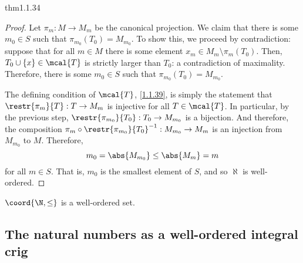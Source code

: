\begin{thm}{}{thm1.1.34}
\begin{proof}
Let $\pi _m:M\rightarrow M_m$ be the canonical projection.  We claim that there is some $m_0\in S$ such that $\pi _{m_0}(T_0)=M_{m_0}$.  To show this, we proceed by contradiction:  suppose that for all $m\in M$ there is some element $x_m\in M_m\setminus \pi _m(T_0)$.  Then, $T_0\cup \{ x\}\in \mcal{T}$ is strictly larger than $T_0$:  a contradiction of maximality.  Therefore, there is some $m_0\in S$ such that $\pi _{m_0}(T_0)=M_{m_0}$.

The defining condition of $\mcal{T}$, \eqref{1.1.39}, is simply the statement that $\restr{\pi _m}{T}:T\rightarrow M_m$ is injective for all $T\in \mcal{T}$.  In particular, by the previous step, $\restr{\pi _{m_0}}{T_0}:T_0\rightarrow M_{m_0}$ is a bijection.  And therefore, the composition $\pi _m\circ \restr{\pi _{m_0}}{T_0}^{-1}:M_{m_0}\rightarrow M_m$ is an injection from $M_{m_0}$ to $M$.  Therefore,
\begin{equation}
m_0=\abs{M_{m_0}}\leq \abs{M_m}=m
\end{equation}
for all $m\in S$.  That is, $m_0$ is the smallest element of $S$, and so $\aleph$ is well-ordered.
\end{proof}
\end{thm}
\begin{crl}{}{}
$\coord{\N ,\leq}$ is a well-ordered set.
\end{crl}

\subsection{The natural numbers as a well-ordered integral crig}

